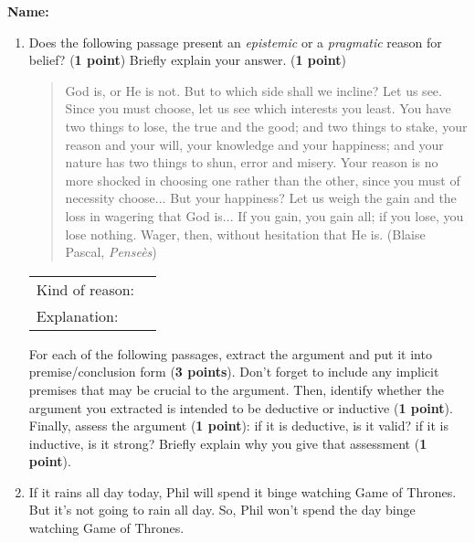 \documentclass[10pt]{article}
\begin{document}
\textbf{Name:}\underline{\hspace{2in}}



\begin{enumerate}
  \item Does the following passage present an \textit{epistemic} or a \textit{pragmatic} reason for belief? (\textbf{1 point}) Briefly explain your answer. (\textbf{1 point})
  
  \begin{quotation}
    God is, or He is not. But to which side shall we incline? Let us see. Since you must choose, let us see which interests you least. You have two things to lose, the true and the good; and two things to stake, your reason and your will, your knowledge and your happiness; and your nature has two things to shun, error and misery. Your reason is no more shocked in choosing one rather than the other, since you must of necessity choose... But your happiness? Let us weigh the gain and the loss in wagering that God is... If you gain, you gain all; if you lose, you lose nothing. Wager, then, without hesitation that He is. (Blaise Pascal, \textit{Pense\`es})
  \end{quotation}
  
   \begin{tabular}{ll}
    Kind of reason: & \underline{\hspace{1.5in}} \\
    Explanation: & \\
  \end{tabular}
  

\vspace{.7in}
  
For each of the following passages, extract the argument and put it into premise/conclusion form (\textbf{3 points}). Don't forget to include any implicit premises that may be crucial to the argument. Then, identify whether the argument you extracted is intended to be deductive or inductive (\textbf{1 point}).  Finally, assess the argument (\textbf{1 point}): if it is deductive, is it valid?  if it is inductive, is it strong? Briefly explain why you give that assessment (\textbf{1 point}).
 
   \item If it rains all day today, Phil will spend it binge watching Game of Thrones. But it's not going to rain all day.  So, Phil won't spend the day binge watching Game of Thrones.
  

\end{enumerate}
\end{document}
